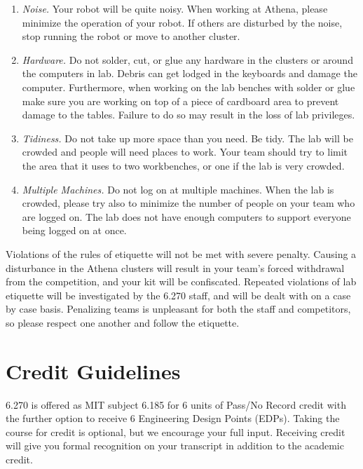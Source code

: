 \begin{enumerate}

\item{\it Noise.}  Your robot will be quite noisy. When working at Athena,
please minimize the operation of your robot. If others are disturbed by the
noise, stop running the robot or move to another cluster.

\item{\it Hardware.}  Do not solder, cut, or glue any hardware in the clusters
or around the computers in lab. Debris can get lodged in the keyboards and
damage the computer. Furthermore, when working on the lab benches with solder or
glue make sure you are working on top of a piece of cardboard
area to prevent damage to the tables. Failure to do so may result in the loss of 
lab privileges.

\item{\it Tidiness.}  Do not take up more space than you need. Be tidy. The lab will
be crowded and people will need places to work. Your team should try to limit the
area that it uses to two workbenches, or one if the lab is very crowded.

\item{\it Multiple Machines.}  Do not log on at multiple machines.
When the lab is crowded, please try also to minimize the number of
people on your team who are logged on. The lab does not have enough
computers to support everyone being logged on at once.

\end{enumerate}

Violations of the rules of etiquette will not be met with severe penalty.
Causing a disturbance in the Athena clusters will result in your team's forced 
withdrawal from the competition, and your kit will be confiscated. Repeated 
violations of lab etiquette will be investigated by the 6.270 staff, and will
be dealt with on a case by case basis. Penalizing teams is unpleasant for both
the staff and competitors, so please respect one another and follow the
etiquette.

\section{Credit Guidelines}

6.270 is offered as MIT subject 6.185 for 6 units of Pass/No Record credit with
the further option to receive 6 Engineering Design Points (EDPs). Taking the
course for credit is optional, but we encourage your full input.
Receiving credit will give you formal recognition on your transcript in addition
to the academic credit.


